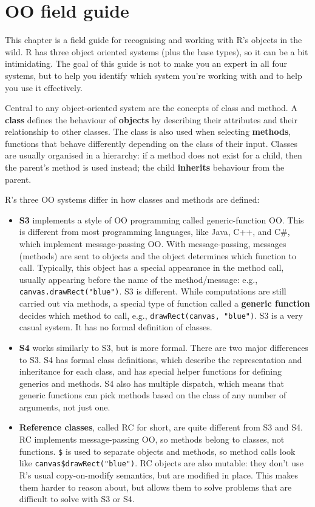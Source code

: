 \chapter{OO field guide}\label{oo}

This chapter is a field guide for recognising and working with R's
objects in the wild. R has three object oriented systems (plus the base
types), so it can be a bit intimidating. The goal of this guide is not
to make you an expert in all four systems, but to help you identify
which system you're working with and to help you use it effectively.

Central to any object-oriented system are the concepts of class and
method. A \textbf{class} defines the behaviour of \textbf{objects} by
describing their attributes and their relationship to other classes. The
class is also used when selecting \textbf{methods}, functions that
behave differently depending on the class of their input. Classes are
usually organised in a hierarchy: if a method does not exist for a
child, then the parent's method is used instead; the child
\textbf{inherits} behaviour from the parent.

R's three OO systems differ in how classes and methods are defined:

\begin{itemize}
\item
  \textbf{S3} implements a style of OO programming called
  generic-function OO. This is different from most programming
  languages, like Java, C++, and C\#, which implement message-passing
  OO. With message-passing, messages (methods) are sent to objects and
  the object determines which function to call. Typically, this object
  has a special appearance in the method call, usually appearing before
  the name of the method/message: e.g.,
  \texttt{canvas.drawRect("blue")}. S3 is different. While computations
  are still carried out via methods, a special type of function called a
  \textbf{generic function} decides which method to call, e.g.,
  \texttt{drawRect(canvas, "blue")}. S3 is a very casual system. It has
  no formal definition of classes.
\item
  \textbf{S4} works similarly to S3, but is more formal. There are two
  major differences to S3. S4 has formal class definitions, which
  describe the representation and inheritance for each class, and has
  special helper functions for defining generics and methods. S4 also
  has multiple dispatch, which means that generic functions can pick
  methods based on the class of any number of arguments, not just one.
\item
  \textbf{Reference classes}, called RC for short, are quite different
  from S3 and S4. RC implements message-passing OO, so methods belong to
  classes, not functions. \texttt{\$} is used to separate objects and
  methods, so method calls look like \texttt{canvas\$drawRect("blue")}.
  RC objects are also mutable: they don't use R's usual copy-on-modify
  semantics, but are modified in place. This makes them harder to reason
  about, but allows them to solve problems that are difficult to solve
  with S3 or S4.
\end{itemize}

